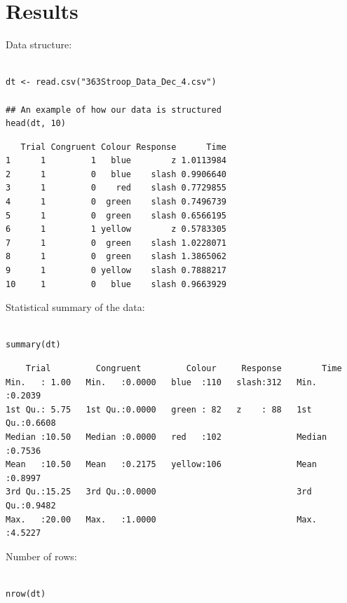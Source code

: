 \documentclass{article}
\begin{document}
\section{Results}
\label{sec:orgc90c501}

Data structure:

\begin{verbatim}

dt <- read.csv("363Stroop_Data_Dec_4.csv")

## An example of how our data is structured
head(dt, 10)

\end{verbatim}

\begin{verbatim}
   Trial Congruent Colour Response      Time
1      1         1   blue        z 1.0113984
2      1         0   blue    slash 0.9906640
3      1         0    red    slash 0.7729855
4      1         0  green    slash 0.7496739
5      1         0  green    slash 0.6566195
6      1         1 yellow        z 0.5783305
7      1         0  green    slash 1.0228071
8      1         0  green    slash 1.3865062
9      1         0 yellow    slash 0.7888217
10     1         0   blue    slash 0.9663929
\end{verbatim}

Statistical summary of the data:

\begin{verbatim}

summary(dt)

\end{verbatim}

\begin{verbatim}
    Trial         Congruent         Colour     Response        Time       
Min.   : 1.00   Min.   :0.0000   blue  :110   slash:312   Min.   :0.2039  
1st Qu.: 5.75   1st Qu.:0.0000   green : 82   z    : 88   1st Qu.:0.6608  
Median :10.50   Median :0.0000   red   :102               Median :0.7536  
Mean   :10.50   Mean   :0.2175   yellow:106               Mean   :0.8997  
3rd Qu.:15.25   3rd Qu.:0.0000                            3rd Qu.:0.9482  
Max.   :20.00   Max.   :1.0000                            Max.   :4.5227
\end{verbatim}

Number of rows:

\begin{verbatim}

nrow(dt)

\end{verbatim}
\end{document}
